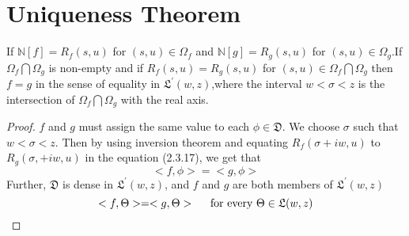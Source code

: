  \section{Uniqueness Theorem}
\begin{theorem}
If $\mathbb{N}[f]=R_{f}(s,u)$ for $(s,u)\in \Omega_{f}$ and $\mathbb{N}[g]=R_{g}(s,u)$ for $(s,u)\in \Omega_{g}$.If $\Omega_{f}\bigcap\Omega_{g}$ is non-empty and if $R_{f}(s,u)=R_{g}(s,u)$ for $(s,u)\in \Omega_{f}\bigcap\Omega_{g}$ then $f=g$ in the sense of equality in $\mathfrak{L}^{'}(w,z)$,where the interval $w<\sigma <z$ is the intersection of $\Omega_{f}\bigcap\Omega_{g}$ with the real axis.
\end{theorem}

\begin{proof}
$f$ and $g$ must assign the same value to each $\phi \in \mathfrak{D}$. We choose $ \sigma $ such that $ w<\sigma <z $. Then by using inversion theorem and equating $ R_{f}(\sigma+iw,u) $ to $ R_{g}(\sigma,+iw,u) $ in the equation (2.3.17), we get that
\begin{equation}
<f,\phi>=<g,\phi>
\end{equation}
Further, $ \mathfrak{D} $ is dense in $\mathfrak{L}^{'}(w,z)$, and $f$ and $g$ are both members of $\mathfrak{L}^{'}(w,z)$
\begin{equation}
<f,\Theta>=<g,\Theta> \hspace{0.5cm} \text{for every } \Theta \in \mathfrak{L}(w,z)
\end{equation}
\end{proof}













